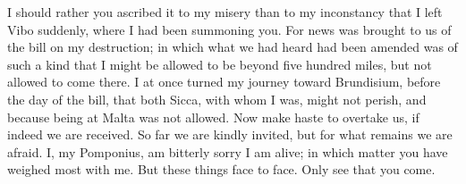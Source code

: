 

I should rather you ascribed it to my misery than to my inconstancy that I left Vibo suddenly, where I had been summoning you. For news was brought to us of the bill on my destruction; in which what we had heard had been amended was of such a kind that I might be allowed to be beyond five hundred miles, but not allowed to come there. I at once turned my journey toward Brundisium, before the day of the bill, that both Sicca, with whom I was, might not perish, and because being at Malta was not allowed. Now make haste to overtake us, if indeed we are received. So far we are kindly invited, but for what remains we are afraid. I, my Pomponius, am bitterly sorry I am alive; in which matter you have weighed most with me. But these things face to face. Only see that you come.
